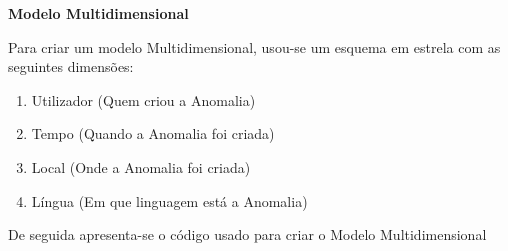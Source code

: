 \documentclass[12pt]{report}
\begin{document}
    \newpage
    \Large
    \textbf{Modelo Multidimensional}\\
    \normalsize
    \par Para criar um modelo Multidimensional, usou-se um esquema em estrela com as seguintes  dimensões:

    \begin{enumerate}[leftmargin=3\parindent]
        \item Utilizador (Quem criou a Anomalia)
        \item Tempo (Quando a Anomalia foi criada)
        \item Local (Onde a Anomalia foi criada)
        \item Língua (Em que linguagem está a Anomalia)
    \end{enumerate}

    \par De seguida apresenta-se o código usado para criar o Modelo Multidimensional
\end{document}
